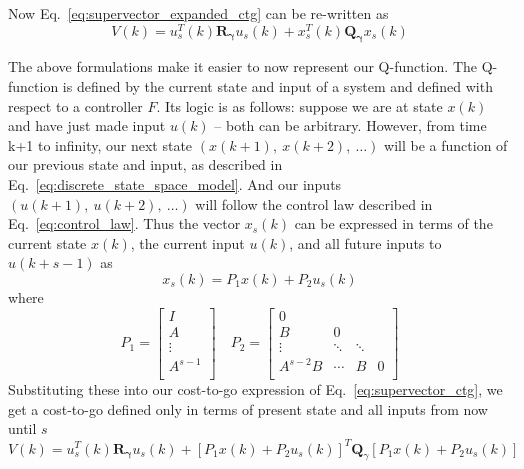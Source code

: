 Now Eq.~\ref{eq:supervector_expanded_ctg} can be re-written as
\begin{equation}
    V\left(k\right)=u_s^T\left(k\right)\textbf{R}_\mathbf{\gamma}u_s\left(k\right)+x_s^T\left(k\right)\textbf{Q}_\mathbf{\gamma}{x}_{s}\left({k}\right)
    \label{eq:supervector_ctg}
\end{equation}

The above formulations make it easier to now represent our Q-function. The Q-function is defined by the current state and input of a system and defined with respect to a controller $F$. Its logic is as follows: suppose we are at state $x\left(k\right)$ and have just made input $u\left(k\right)$ -- both can be arbitrary. However, from time k+1 to infinity, our next state $(x(k+1),\ x(k+2),\ \ldots)$ will be a function of our previous state and input, as described in Eq.~\ref{eq:discrete_state_space_model}. And our inputs $(u(k+1),\ u(k+2),\ \ldots)$ will follow the control law described in Eq.~\ref{eq:control_law}. Thus the vector $x_s\left(k\right)$ can be expressed in terms of the current state $x\left(k\right)$, the current input $u\left(k\right)$, and all future inputs to $u\left(k+s-1\right)$ as
\begin{equation}
    x_s\left(k\right)=P_1x\left(k\right)+P_2u_s\left(k\right)
    \label{eq:xs}
\end{equation}
where
\begin{equation}
    P_1=\left[\begin{matrix}I\\A\\\vdots\\A^{s-1}\\\end{matrix}\right]	
    \quad
    P_2=\left[\begin{matrix}0&&&\\B&0&&\\\vdots&\ddots&\ddots&\\A^{s-2}B&\cdots&B&0\\\end{matrix}\right]
    \label{eq:P1_P2}
\end{equation}
Substituting these into our cost-to-go expression of Eq.~\ref{eq:supervector_ctg}, we get a cost-to-go defined only in terms of present state and all inputs from now until $s$
\begin{equation}
    V\left(k\right)=u_s^T\left(k\right)\mathbf{R}_\mathbf{\gamma}u_s\left(k\right)+{\left[P_1x\left(k\right)+P_2u_s\left(k\right)\right]}^T\textbf{Q}_\gamma\left[P_1x\left(k\right)+P_2u_s\left(k\right)\right]
\end{equation}
